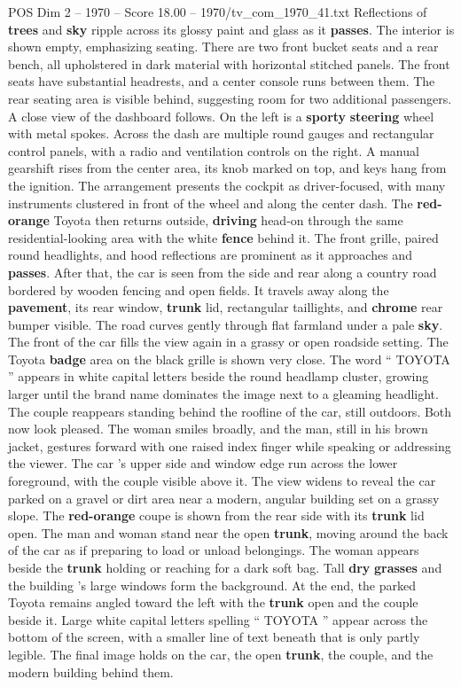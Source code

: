 \begin{textsample}{POS Dim 2 – 1970 – Score 18.00 – 1970/tv\_com\_1970\_41.txt}
Reflections of \textbf{trees} and \textbf{sky} ripple across its glossy paint and glass as it \textbf{passes}.
The interior is shown empty, emphasizing seating.
There are two front bucket seats and a rear bench, all upholstered in dark material with horizontal stitched panels.
The front seats have substantial headrests, and a center console runs between them.
The rear seating area is visible behind, suggesting room for two additional passengers.
A close view of the dashboard follows.
On the left is a \textbf{sporty} \textbf{steering} wheel with metal spokes.
Across the dash are multiple round gauges and rectangular control panels, with a radio and ventilation controls on the right.
A manual gearshift rises from the center area, its knob marked on top, and keys hang from the ignition.
The arrangement presents the cockpit as driver-focused, with many instruments clustered in front of the wheel and along the center dash.
The \textbf{red-orange} Toyota then returns outside, \textbf{driving} head-on through the same residential-looking area with the white \textbf{fence} behind it.
The front grille, paired round headlights, and hood reflections are prominent as it approaches and \textbf{passes}.
After that, the car is seen from the side and rear along a country road bordered by wooden fencing and open fields.
It travels away along the \textbf{pavement}, its rear window, \textbf{trunk} lid, rectangular taillights, and \textbf{chrome} rear bumper visible.
The road curves gently through flat farmland under a pale \textbf{sky}.
The front of the car fills the view again in a grassy or open roadside setting.
The Toyota \textbf{badge} area on the black grille is shown very close.
The word “ TOYOTA ” appears in white capital letters beside the round headlamp cluster, growing larger until the brand name dominates the image next to a gleaming headlight.
The couple reappears standing behind the roofline of the car, still outdoors.
Both now look pleased.
The woman smiles broadly, and the man, still in his brown jacket, gestures forward with one raised index finger while speaking or addressing the viewer.
The car ’s upper side and window edge run across the lower foreground, with the couple visible above it.
The view widens to reveal the car parked on a gravel or dirt area near a modern, angular building set on a grassy slope.
The \textbf{red-orange} coupe is shown from the rear side with its \textbf{trunk} lid open.
The man and woman stand near the open \textbf{trunk}, moving around the back of the car as if preparing to load or unload belongings.
The woman appears beside the \textbf{trunk} holding or reaching for a dark soft bag.
Tall \textbf{dry} \textbf{grasses} and the building ’s large windows form the background.
At the end, the parked Toyota remains angled toward the left with the \textbf{trunk} open and the couple beside it.
Large white capital letters spelling “ TOYOTA ” appear across the bottom of the screen, with a smaller line of text beneath that is only partly legible.
The final image holds on the car, the open \textbf{trunk}, the couple, and the modern building behind them.

\end{textsample}
